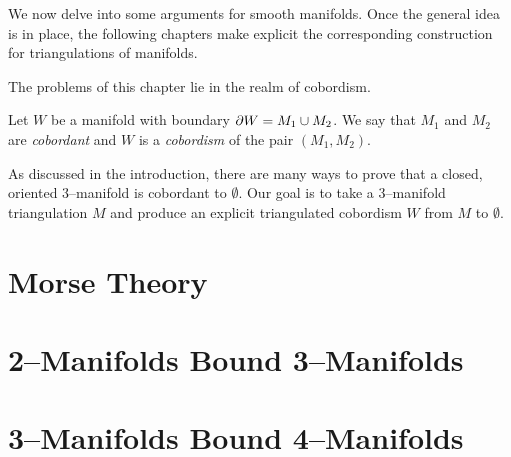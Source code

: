 \label{cha:cobordisms}

We now delve into some arguments for smooth manifolds.
Once the general idea is in place, the following chapters make explicit the corresponding construction for triangulations of manifolds.

The problems of this chapter lie in the realm of cobordism.
\begin{defn}
  \label{def:cobordism}
  Let $W$ be a manifold with boundary $\partial W=M_1\cup M_2$.
  We say that $M_1$ and $M_2$ are \emph{cobordant} and $W$ is a \emph{cobordism} of the pair $(M_1,M_2)$.
\end{defn}
As discussed in the introduction, there are many ways to prove that a closed, oriented 3--manifold is cobordant to $\emptyset$.
Our goal is to take a 3--manifold triangulation $M$ and produce an explicit triangulated cobordism $W$ from $M$ to $\emptyset$.

\section{Morse Theory}


\section{2--Manifolds Bound 3--Manifolds}


\section{3--Manifolds Bound 4--Manifolds}


%
